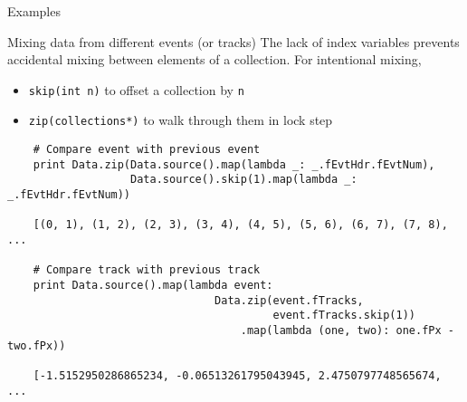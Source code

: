 \documentclass{beamer}
\begin{document}
\begin{frame}[fragile]{Examples}
\begin{block}{Mixing data from different events (or tracks)}
The lack of index variables prevents accidental mixing between elements of a collection. For intentional mixing,
\begin{itemize}
\item {\tt skip(int n)} to offset a collection by {\tt n}
\item {\tt zip(collections*)} to walk through them in lock step
\end{itemize}

\vfill
{\scriptsize \begin{verbatim}
    # Compare event with previous event
    print Data.zip(Data.source().map(lambda _: _.fEvtHdr.fEvtNum),
                   Data.source().skip(1).map(lambda _: _.fEvtHdr.fEvtNum))

    [(0, 1), (1, 2), (2, 3), (3, 4), (4, 5), (5, 6), (6, 7), (7, 8), ...

    # Compare track with previous track
    print Data.source().map(lambda event:
                                Data.zip(event.fTracks,
                                         event.fTracks.skip(1))
                                    .map(lambda (one, two): one.fPx - two.fPx))

    [-1.5152950286865234, -0.06513261795043945, 2.4750797748565674, ...
\end{verbatim}}
\end{block}
\end{frame}
\end{document}
